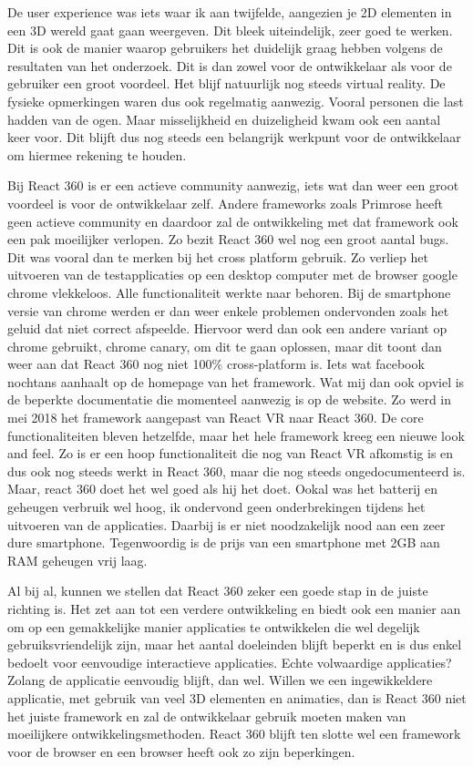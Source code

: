 De user experience was iets waar ik aan twijfelde, aangezien je 2D elementen in een 3D wereld gaat gaan weergeven. Dit bleek uiteindelijk, zeer goed te werken. Dit is ook de manier waarop gebruikers het duidelijk graag hebben volgens de resultaten van het onderzoek. Dit is dan zowel voor de ontwikkelaar als voor de gebruiker een groot voordeel. Het blijf natuurlijk nog steeds virtual reality. De fysieke opmerkingen waren dus ook regelmatig aanwezig. Vooral personen die last hadden van de ogen. Maar misselijkheid en duizeligheid kwam ook een aantal keer voor. Dit blijft dus nog steeds een belangrijk werkpunt voor de ontwikkelaar om hiermee rekening te houden.

Bij React 360 is er een actieve community aanwezig, iets wat dan weer een groot voordeel is voor de ontwikkelaar zelf. Andere frameworks zoals Primrose heeft geen actieve community en daardoor zal de ontwikkeling met dat framework ook een pak moeilijker verlopen. Zo bezit React 360 wel nog een groot aantal bugs. Dit was vooral dan te merken bij het cross platform gebruik. Zo verliep het uitvoeren van de testapplicaties op een desktop computer met de browser google chrome vlekkeloos. Alle functionaliteit werkte naar behoren. Bij de smartphone versie van chrome werden er dan weer enkele problemen ondervonden zoals het geluid dat niet correct afspeelde. Hiervoor werd dan ook een andere variant op chrome gebruikt, chrome canary, om dit te gaan oplossen, maar dit toont dan weer aan dat React 360 nog niet 100\% cross-platform is. Iets wat facebook nochtans aanhaalt op de homepage van het framework. Wat mij dan ook opviel is de beperkte documentatie die momenteel aanwezig is op de website. Zo werd in mei 2018 het framework aangepast van React VR naar React 360. De core functionaliteiten bleven hetzelfde, maar het hele framework kreeg een nieuwe look and feel. Zo is er een hoop functionaliteit die nog van React VR afkomstig is en dus ook nog steeds werkt in React 360, maar die nog steeds ongedocumenteerd is. Maar, react 360 doet het wel goed als hij het doet. Ookal was het batterij en geheugen verbruik wel hoog, ik ondervond geen onderbrekingen tijdens het uitvoeren van de applicaties. Daarbij is er niet noodzakelijk nood aan een zeer dure smartphone. Tegenwoordig is de prijs van een smartphone met 2GB aan RAM geheugen vrij laag.

Al bij al, kunnen we stellen dat React 360 zeker een goede stap in de juiste richting is. Het zet aan tot een verdere ontwikkeling en biedt ook een manier aan om op een gemakkelijke manier applicaties te ontwikkelen die wel degelijk gebruiksvriendelijk zijn, maar het aantal doeleinden blijft beperkt en is dus enkel bedoelt voor eenvoudige interactieve applicaties. Echte volwaardige applicaties? Zolang de applicatie eenvoudig blijft, dan wel. Willen we een ingewikkeldere applicatie, met gebruik van veel 3D elementen en animaties, dan is React 360 niet het juiste framework en zal de ontwikkelaar gebruik moeten maken van moeilijkere ontwikkelingsmethoden. React 360 blijft ten slotte wel een framework voor de browser en een browser heeft ook zo zijn beperkingen.